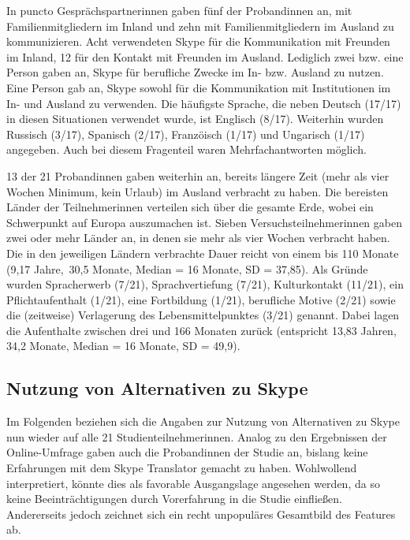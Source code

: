 In puncto Gesprächspartner{\textperiodcentered}innen gaben fünf der Proband{\textperiodcentered}innen an, mit Familienmitgliedern im Inland und zehn mit Familienmitgliedern im Ausland zu kommunizieren. Acht verwendeten Skype für die Kommunikation mit Freunden im Inland, 12 für den Kontakt mit Freunden im Ausland. Lediglich zwei bzw. eine Person gaben an, Skype für berufliche Zwecke im In- bzw. Ausland zu nutzen. Eine Person gab an, Skype sowohl für die Kommunikation mit Institutionen im In- und Ausland zu verwenden. Die häufigste Sprache, die neben Deutsch (17/17) in diesen Situationen verwendet wurde, ist Englisch (8/17). Weiterhin wurden Russisch (3/17), Spanisch (2/17), Franzöisch (1/17) und Ungarisch (1/17) angegeben. Auch bei diesem Fragenteil waren Mehrfachantworten möglich.

13 der 21 Proband{\textperiodcentered}innen gaben weiterhin an, bereits längere Zeit (mehr als vier Wochen Minimum, kein Urlaub) im Ausland verbracht zu haben. Die bereisten Länder der Teilnehmer{\textperiodcentered}innen verteilen sich über die gesamte Erde, wobei ein Schwerpunkt auf Europa auszumachen ist. Sieben Versuchsteilnehmer{\textperiodcentered}innen gaben zwei oder mehr Länder an, in denen sie mehr als vier Wochen verbracht haben. Die in den jeweiligen Ländern verbrachte Dauer reicht von einem bis 110 Monate (9,17 Jahre, \diameter\,30,5 Monate, Median = 16 Monate, SD = 37,85). Als Gründe wurden Spracherwerb (7/21), Sprachvertiefung (7/21), Kulturkontakt (11/21), ein Pflichtaufenthalt (1/21), eine Fortbildung (1/21), berufliche Motive (2/21) sowie die (zeitweise) Verlagerung des Lebensmittelpunktes (3/21) genannt. Dabei lagen die Aufenthalte zwischen drei und 166 Monaten zurück (entspricht 13,83 Jahren, \diameter\,34,2 Monate, Median = 16 Monate, SD = 49,9).


\subsection{Nutzung von Alternativen zu Skype}

\label{K6:subsubsec:Nutzung-Alternativen-CatDe}


Im Folgenden beziehen sich die Angaben zur Nutzung von Alternativen zu Skype nun wieder auf alle 21 Studienteilnehmer{\textperiodcentered}innen. Analog zu den Ergebnissen der Online-Umfrage gaben auch die Proband{\textperiodcentered}innen der Studie an, bislang keine Erfahrungen mit dem Skype Translator gemacht zu haben. Wohlwollend interpretiert, könnte dies als favorable Ausgangslage angesehen werden, da so keine Beeinträchtigungen durch Vorerfahrung in die Studie einfließen. Andererseits jedoch zeichnet sich ein recht unpopuläres Gesamtbild des Features ab.

